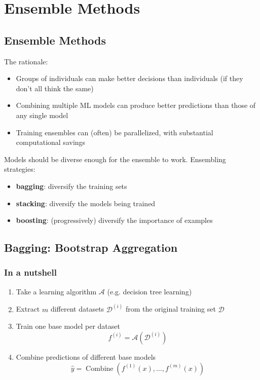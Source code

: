 \chapter{Ensemble Methods}
\label{cha:ensemble_methods}

\section{Ensemble Methods}

The rationale:
\begin{itemize}
	\item Groups of individuals can make better decisions than individuals (if
		they don't all think the same)

	\item Combining multiple ML models can produce better predictions than those of
		any single model

	\item Training ensembles can (often) be parallelized, with substantial
		computational savings
\end{itemize}

Models should be diverse enough for the ensemble to work. Ensembling strategies:

\begin{itemize}
	\item \textbf{bagging}: diversify the training sets

	\item \textbf{stacking}: diversify the models being trained

	\item \textbf{boosting}: (progressively) diversify the importance of examples
\end{itemize}

\section{Bagging: Bootstrap Aggregation}

\subsection{In a nutshell}
\begin{enumerate}[]
	\item Take a learning algorithm $\mathcal{A}$ (e.g. decision tree learning)

	\item Extract $m$ different datasets $\mathcal{D}^{(i)}$ from the original training
		set $\mathcal{D}$

	\item Train one base model per dataset
		\[
			f^{(i)}=\mathcal{A}\left(\mathcal{D}^{(i)}\right)
		\]

	\item Combine predictions of different base models
		\[
			\hat{y}=\operatorname{Combine}\left(f^{(1)}(x), \ldots, f^{(m)}(x)\right)
		\]
\end{enumerate}

